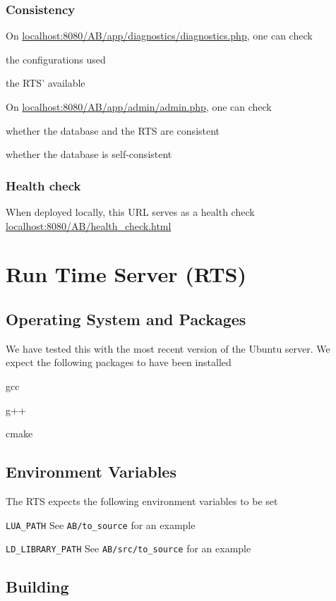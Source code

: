 \documentclass[letterpaper]{article}
\begin{document}
\subsubsection{Consistency}

On \url{localhost:8080/AB/app/diagnostics/diagnostics.php}, one can check
\be
\item the configurations used
\item the RTS' available
  \ee

On \url{localhost:8080/AB/app/admin/admin.php}, one can check
\be
\item whether the database and the RTS are consistent
\item whether the database is self-consistent \TBC
\ee 

\subsubsection{Health check}
When deployed locally, this URL serves as a health check
\url{localhost:8080/AB/health_check.html}

\section{Run Time Server (RTS)}

\subsection{Operating System and Packages}
We have tested this with the most recent version of the Ubuntu server. We expect
the following packages to have been installed
\be
\item gcc
\item g++
\item cmake
\ee


\subsection{Environment Variables}

The RTS expects the following environment variables to be set
\be
\item \verb+LUA_PATH+ 
  See \verb+AB/to_source+ for an example
\item \verb+LD_LIBRARY_PATH+
  See \verb+AB/src/to_source+ for an example
  \ee

\subsection{Building}
\end{document}

